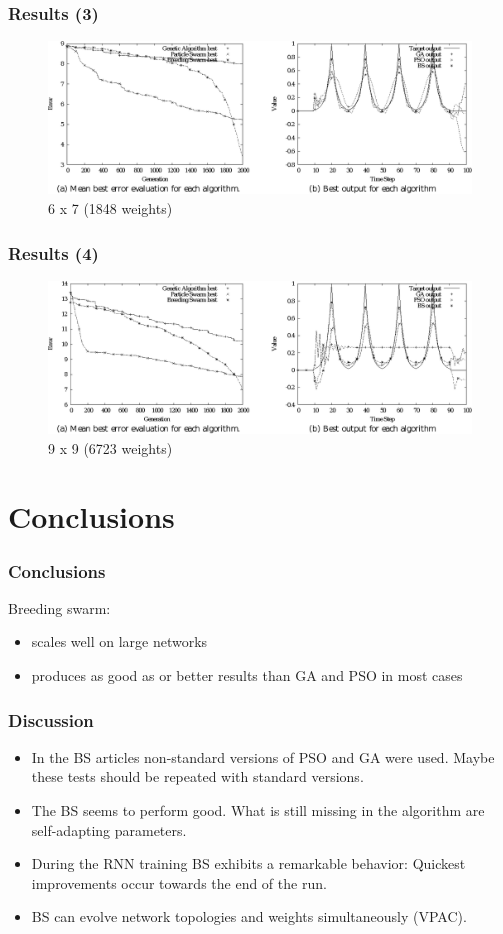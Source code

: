 \documentclass{beamer}
\begin{document}
\begin{frame}[fragile]
  \frametitle{Results (3)}
  \begin{figure}
   \includegraphics[scale=0.7]{results3}
   \caption{6 x 7 (1848 weights)}
  \end{figure}
\end{frame}
\begin{frame}[fragile]
  \frametitle{Results (4)}
  \begin{figure}
   \includegraphics[scale=0.7]{results4}
   \caption{9 x 9 (6723 weights)}
  \end{figure}
\end{frame}


\section{Conclusions} 
\begin{frame}[fragile]
  \frametitle{Conclusions}
  Breeding swarm:
  \begin{itemize}
    \item scales well on large networks
    \item produces as good as or better results than GA and PSO in most cases
  \end{itemize}
\end{frame}

\begin{frame}[fragile]
  \frametitle{Discussion}
  \begin{itemize}
    \item In the BS articles non-standard versions of PSO and GA were used. Maybe these tests should be repeated with standard versions.
    \item The BS seems to perform good. What is still missing in the algorithm are self-adapting parameters.
    \item During the RNN training BS exhibits a remarkable behavior: Quickest improvements occur towards the end of the run.
    \item BS can evolve network topologies and weights simultaneously (VPAC).
  \end{itemize}
\end{frame}
\end{document}
